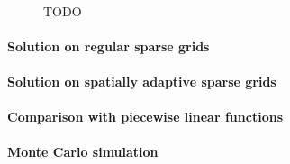 \begin{figure}
  \hfill%
  \hfill%
  \\[1mm]%
  \hfill%
  \hfill%
  \caption[TODO]{%
    TODO%
  }%
  \label{fig:TODO}%
\end{figure}

\paragraph{Solution on regular sparse grids}

\dummytext[8]{}

\paragraph{Solution on spatially adaptive sparse grids}

\dummytext[8]{}

\paragraph{Comparison with piecewise linear functions}

\dummytext[8]{}

\paragraph{Monte Carlo simulation}

